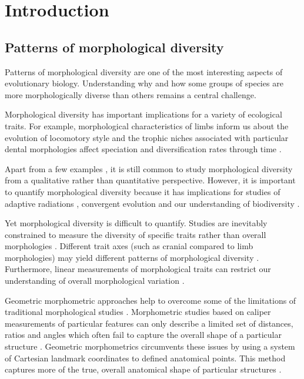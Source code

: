 \chapter{Introduction}
\label{chap:introduction}


\noindent


\section{Patterns of morphological diversity}

	Patterns of morphological diversity are one of the most interesting aspects of evolutionary biology. Understanding why and how some groups of species are more morphologically diverse than others remains a central challenge. 
	
	Morphological diversity has important implications for a variety of ecological traits. For example, morphological characteristics of limbs inform us about the evolution of locomotory style \citep[e.g.][]{Bou1987} and the trophic niches associated with particular dental morphologies affect speciation and diversification rates through time \citep{Price2012}. 
	
	Apart from a few examples \citep[e.g.][]{Brusatte2008, Goswami2011, Ruta2013}, it is still common to study morphological diversity from a qualitative rather than quantitative perspective. However, it is important to quantify morphological diversity because it has implications for studies of adaptive radiations \citep{Losos2010}, convergent evolution \citep[e.g.][]{Muschick2012, Harmon2005} and our understanding of biodiversity \citep{Roy1997}.

	Yet morphological diversity is difficult to quantify. Studies are inevitably constrained to measure the diversity of specific traits rather than overall morphologies \citep{Roy1997}. Different trait axes (such as cranial compared to limb morphologies) may yield different patterns of morphological diversity \citep{Foth2012}. Furthermore, linear measurements of morphological traits can restrict our understanding of overall morphological variation \citep{Rohlf1993}.
	
	Geometric morphometric approaches help to overcome some of the limitations of traditional morphological studies \citep{Adams2004}. Morphometric studies based on caliper measurements of particular features can only describe a limited set of distances, ratios and angles which often fail to capture the overall shape of a particular structure \citep{Slice2007}. Geometric morphometrics circumvents these issues by using a system of Cartesian landmark coordinates to defined anatomical points. This method captures more of the true, overall anatomical shape of particular structures \citep{Mitteroecker2009}.
	
